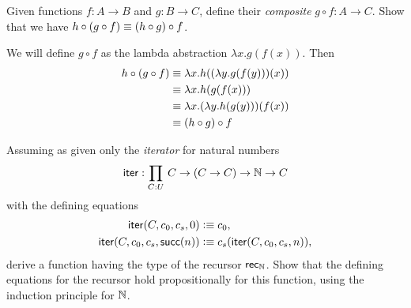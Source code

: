 

\usepackage{amsthm}





\begin{problem}
  Given functions $f : A \to B$ and $g : B \to C$, define their \emph{composite} $g \circ f : A \to C$.
  Show that we have $h \circ (g \circ f) \equiv (h \circ g) \circ f$.
\end{problem}

\begin{solution}
  We will define $g \circ f$ as the lambda abstraction $\lambda x. g(f(x))$. Then
  \begin{align*}
    h \circ (g \circ f) &\equiv \lambda x. h((\lambda y. g(f(y)))(x)) \\
                        &\equiv \lambda x. h(g(f(x))) \\
                        &\equiv \lambda x. (\lambda y. h(g(y)))(f(x)) \\
                        &\equiv (h \circ g) \circ f
  \end{align*}
\end{solution}

\begin{problem}
  Assuming as given only the \emph{iterator} for natural numbers
  $$ \ite : \prd{C : U} C \to (C \to C) \to \nat \to C $$
  with the defining equations
  \begin{align*}
    \mathsf{iter}(C,c_0,c_s,0) &\vcentcolon\equiv c_0,\\
    \mathsf{iter}(C,c_0,c_s,\mathsf{succ}(n)) &\vcentcolon\equiv c_s(\mathsf{iter}(C,c_0,c_s,n)),
  \end{align*}
  derive a function having the type of the recursor $\mathsf{rec}_{\mathbb{N}}$.
  Show that the defining equations for the recursor hold propositionally for this function, using the induction principle for $\mathbb{N}$.
\end{problem}

